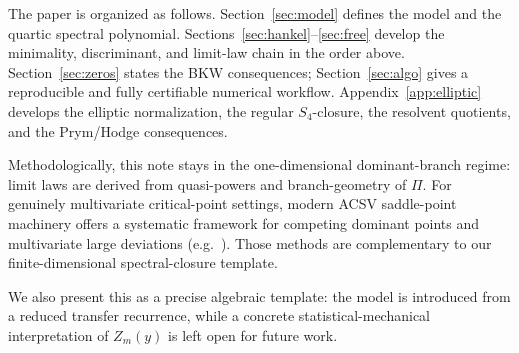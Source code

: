The paper is organized as follows.
Section~\ref{sec:model} defines the model and the quartic spectral polynomial.
Sections~\ref{sec:hankel}--\ref{sec:free} develop the minimality, discriminant, and limit-law chain in the order above.
Section~\ref{sec:zeros} states the BKW consequences; Section~\ref{sec:algo} gives a reproducible and fully certifiable numerical workflow.
Appendix~\ref{app:elliptic} develops the elliptic normalization, the regular \(S_4\)-closure, the resolvent quotients, and the Prym/Hodge consequences.

Methodologically, this note stays in the one-dimensional dominant-branch regime:
limit laws are derived from quasi-powers and branch-geometry of \(\Pi\).
For genuinely multivariate critical-point settings, modern ACSV saddle-point machinery
offers a systematic framework for competing dominant points and multivariate large deviations
(e.g.\ \cite{PemantleWilson2013}).
Those methods are complementary to our finite-dimensional spectral-closure template.

We also present this as a precise algebraic template:
the model is introduced from a reduced transfer recurrence, while a concrete statistical-mechanical
interpretation of \(Z_m(y)\) is left open for future work.
